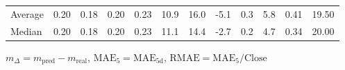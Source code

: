 \begin{threeparttable}
{\begin{tabular}{lrrrrrrrrrrr}
Average &          0.20 &          0.18 &          0.20 &        0.23 &                10.9 &                16.0 &       -5.1 &                 0.3 &              5.8 &            0.41 &                  19.50 \\
 Median &          0.20 &          0.18 &          0.20 &        0.23 &                11.1 &                14.4 &       -2.7 &                 0.2 &              4.7 &            0.34 &                  20.00 \\
\bottomrule
\end{tabular}
}
\begin{tablenotes}\footnotesize
\item $m_\Delta=m_{\text{pred}}-m_{\text{real}}$,
$\mathrm{MAE}_5=\mathrm{MAE}_{5\text{d}}$,
$\mathrm{RMAE}=\mathrm{MAE}_5/\text{Close}$
\end{tablenotes}
\end{threeparttable}
\endgroup

